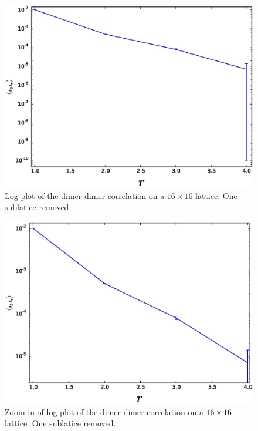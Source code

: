 \documentclass[aps,floatfix,11pt]{revtex4-1}
\begin{document}
\begin{figure}[h]
    \centering
    \includegraphics[width=8.5 cm]{s_dimer_dimer_cor_log_16x16}
    \caption{ Log plot of the dimer dimer correlation on a $16\times16$ lattice. One sublatice removed.
    \label{fig:s_dimer_dimer_log}}
\end{figure}

\begin{figure}[h]
    \centering
    \includegraphics[width=8.5 cm]{s_dimer_dimer_cor_log_16x16_zoom}
    \caption{ Zoom in of log plot of the dimer dimer correlation on a $16\times16$ lattice. One sublatice removed.
    \label{fig:s_dimer_dimer_log_zoom}}
\end{figure}

\end{document}
